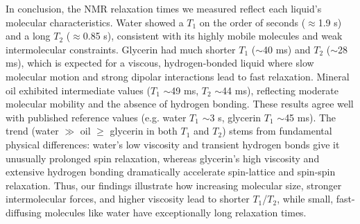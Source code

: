 \documentclass[
    floatfix,  %
    reprint,
    amsmath,
    amssymb,
    aps,
]{revtex4-2}
\begin{document}

In conclusion, the NMR relaxation times we measured reflect each liquid's molecular characteristics. Water showed a $T_1$ on the order of seconds ($\approx$1.9 s) and a long $T_2$ ($\approx$0.85 s), consistent with its highly mobile molecules and weak intermolecular constraints. Glycerin had much shorter $T_1$ ($\sim$40 ms) and $T_2$ ($\sim$28 ms), which is expected for a viscous, hydrogen-bonded liquid where slow molecular motion and strong dipolar interactions lead to fast relaxation. Mineral oil exhibited intermediate values ($T_1$ $\sim$49 ms, $T_2$ $\sim$44 ms), reflecting moderate molecular mobility and the absence of hydrogen bonding. These results agree well with published reference values (e.g. water $T_1$ $\sim$3 s, glycerin $T_1$ $\sim$45 ms). The trend (water $\gg$ oil $\geq$ glycerin in both $T_1$ and $T_2$) stems from fundamental physical differences: water's low viscosity and transient hydrogen bonds give it unusually prolonged spin relaxation, whereas glycerin's high viscosity and extensive hydrogen bonding dramatically accelerate spin-lattice and spin-spin relaxation. Thus, our findings illustrate how increasing molecular size, stronger intermolecular forces, and higher viscosity lead to shorter $T_1$/$T_2$, while small, fast-diffusing molecules like water have exceptionally long relaxation times.
\end{document}
